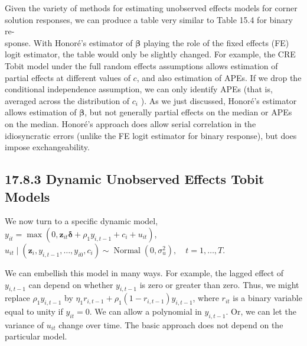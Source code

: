 \documentclass[10pt]{article}
\begin{document}
Given the variety of methods for estimating unobserved effects models for corner solution responses, we can produce a table very similar to Table 15.4 for binary re-\\
sponse. With Honoré's estimator of $\boldsymbol{\beta}$ playing the role of the fixed effects (FE) logit estimator, the table would only be slightly changed. For example, the CRE Tobit model under the full random effects assumptions allows estimation of partial effects at different values of $c$, and also estimation of APEs. If we drop the conditional independence assumption, we can only identify APEs (that is, averaged across the distribution of $c_{i}$ ). As we just discussed, Honoré's estimator allows estimation of $\boldsymbol{\beta}$, but not generally partial effects on the median or APEs on the median. Honoré's approach does allow serial correlation in the idiosyncratic errors (unlike the FE logit estimator for binary response), but does impose exchangeability.

\subsection*{17.8.3 Dynamic Unobserved Effects Tobit Models}
We now turn to a specific dynamic model,\\
$y_{i t}=\max \left(0, \mathbf{z}_{i t} \boldsymbol{\delta}+\rho_{1} y_{i, t-1}+c_{i}+u_{i t}\right)$,\\
$u_{i t} \mid\left(\mathbf{z}_{i}, y_{i, t-1}, \ldots, y_{i 0}, c_{i}\right) \sim \operatorname{Normal}\left(0, \sigma_{u}^{2}\right), \quad t=1, \ldots, T$.

We can embellish this model in many ways. For example, the lagged effect of $y_{i, t-1}$ can depend on whether $y_{i, t-1}$ is zero or greater than zero. Thus, we might replace $\rho_{1} y_{i, t-1}$ by $\eta_{1} r_{i, t-1}+\rho_{1}\left(1-r_{i, t-1}\right) y_{i, t-1}$, where $r_{i t}$ is a binary variable equal to unity if $y_{i t}=0$. We can allow a polynomial in $y_{i, t-1}$. Or, we can let the variance of $u_{i t}$ change over time. The basic approach does not depend on the particular model.
\end{document}
